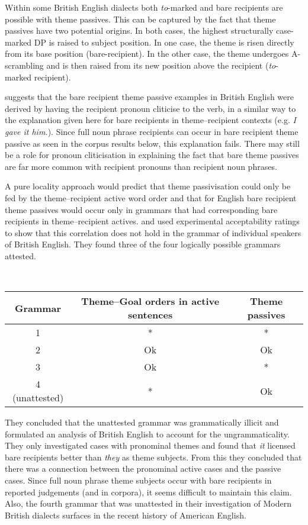 Within some British English dialects both \textit{to}-marked and bare recipients are possible with theme passives. This can be captured by the fact that theme passives have two potential origins. In both cases, the highest structurally case-marked DP is raised to subject position. In one case, the theme is risen directly from its base position (bare-recipient). In the other case, the theme undergoes A-scrambling and is then raised from its new position above the recipient (\textit{to}-marked recipient). 

\cite[pg. 39]{Anagnostopoulou.2003} suggests that the bare recipient theme passive examples in British English were derived by having the recipient pronoun cliticise to the verb, in a similar way to the explanation given here for bare recipients in theme--recipient contexts (e.g. \textit{I gave it him.}). Since full noun phrase recipients can occur in bare recipient theme passive as seen in the corpus results below, this explanation fails. There may still be a role for pronoun cliticisation in explaining the fact that bare theme passives are far more common with recipient pronouns than recipient noun phrases.

A pure locality approach would predict that theme passivisation could only be fed by the theme--recipient active word order and that for English bare recipient theme passives would occur only in grammars that had corresponding bare recipients in theme--recipient actives. \cite{Haddican.2010} and \cite{Haddican.2011,Haddican.2012} used experimental acceptability ratings to show that this correlation does not hold in the grammar of individual speakers of British English. They found three of the four logically possible grammars attested. 

\begin{exe}
\ex \cite[Table 2]{Haddican.2012}\\
 \begin{tabular}{|c|c|c|}
 \hline
 Grammar & Theme--Goal orders in active sentences & Theme passives\\
 \hline
 1 & * & * \\
 \hline
 2 & Ok & Ok \\
 \hline
 3 & Ok & * \\
 \hline
 4 (unattested) & * & Ok \\
 \hline
 \end{tabular}
\end{exe}%

They concluded that the unattested grammar was grammatically illicit and formulated an analysis of British English to account for the ungrammaticality. They only investigated cases with pronominal themes and found that \textit{it} licensed bare recipients better than \textit{they} as theme subjects. From this they concluded that there was a connection between the pronominal active cases and the passive cases. Since full noun phrase theme subjects occur with bare recipients in reported judgements (and in corpora), it seems difficult to maintain this claim. Also, the fourth grammar that was unattested in their investigation of Modern British dialects surfaces in the recent history of American English.

